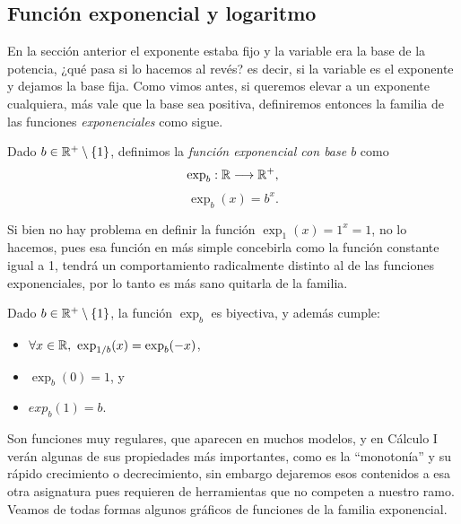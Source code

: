 \subsection{Función exponencial y logaritmo}

En la sección anterior el exponente estaba fijo y la variable era la base de la potencia, ¿qué pasa si lo hacemos al revés? es decir, si la variable es el exponente y dejamos la base fija.
Como vimos antes, si queremos elevar a un exponente cualquiera, más vale que la base sea positiva, definiremos entonces la familia de las funciones \emph{exponenciales} como sigue.

\begin{defn}
Dado $b \in \mathbb{R}^+\setminus\{1\}$, definimos la \emph{función exponencial con base $b$} como 
$$\exp_b: \mathbb{R} \longrightarrow \mathbb{R}^+,$$
$$\exp_b(x) = b^x.$$
\end{defn}

Si bien no hay problema en definir la función $\exp_1(x)=1^x=1$, no lo hacemos, pues esa función en más simple concebirla como la función constante igual a 1, tendrá un comportamiento radicalmente distinto al de las funciones exponenciales, por lo tanto es más sano quitarla de la familia.

\begin{prop}
Dado $b \in \mathbb{R}^+\setminus\{1\}$, la función $\exp_b$ es biyectiva, y además cumple:
\begin{itemize}
\item $\forall x\in\R,\ \exp_{1/b}(x)=\exp_b(-x)$,
\item $\exp_b(0)=1$, y
\item $exp_b(1)=b$.
\end{itemize}
\end{prop}

Son funciones muy regulares, que aparecen en muchos modelos, y en Cálculo I verán algunas de sus propiedades más importantes, como es la ``monotonía'' y su rápido crecimiento o decrecimiento, sin embargo dejaremos esos contenidos a esa otra asignatura pues requieren de herramientas que no competen a nuestro ramo.
Veamos de todas formas algunos gráficos de funciones de la familia exponencial.


\begin{center}
\end{center}


